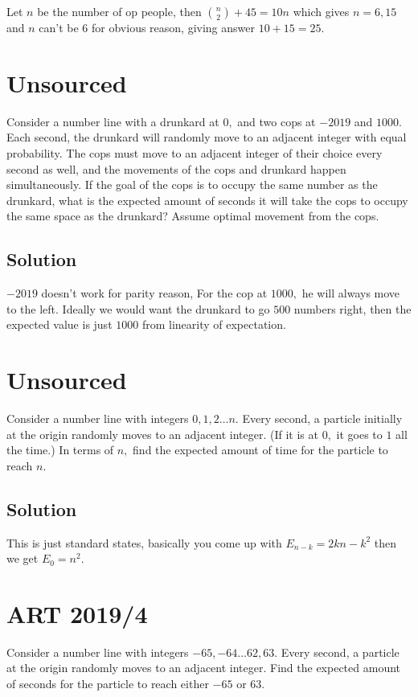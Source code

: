 \documentclass[mast]{lucky}
\begin{document}
Let $n$ be the number of op people, then $\binom n2+ 45 = 10n$ which gives $n=6,15$ and $n$ can't be $6$ for 
obvious reason, giving answer $10+15=25.$





\pagebreak\section{Unsourced}
Consider a number line with a drunkard at $0,$ and two cops at $-2019$ and $1000.$ Each second, the drunkard will randomly move to an adjacent integer with equal probability. The cops must move to an adjacent integer of their choice every second as well, and the movements of the cops and drunkard happen simultaneously. If the goal of the cops is to occupy the same number as the drunkard, what is the expected amount of seconds it will take the cops to occupy the same space as the drunkard? Assume optimal movement from the cops.
\subsection{Solution}
$-2019$ doesn't work for parity reason, For the cop at $1000,$ he will always move to the left. Ideally we would want the drunkard to go $500$ numbers right, then the expected value is just $1000$ from linearity of expectation.      


\pagebreak\section{Unsourced}
Consider a number line with integers $0,1,2\dots n.$ Every second, a particle initially at the origin randomly moves to an adjacent integer. (If it is at $0,$ it goes to $1$ all the time.) In terms of $n,$ find the expected amount of time for the particle to reach $n.$
\subsection{Solution}
This is just standard states, basically you come up with $E_{n-k}=2kn-k^2$ then we get $E_0 = n^2.$



\pagebreak\section{ART 2019/4} Consider a number line with integers $-65,-64\dots 62,63.$ Every second, a particle at the origin randomly moves to an adjacent integer. Find the expected amount of seconds for the particle to reach either $-65$ or $63.$
\end{document}
